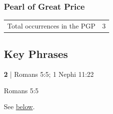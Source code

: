 	\subsubsection{Pearl of Great Price} %
		\label{SHED-PGP}
	
		\begin{tabular}{ll}
			Total occurrences in the PGP & 3
		\end{tabular}
		
		
\subsection{Key Phrases} %
	\label{SHED-PHRASES}

	\begin{compactdesc}
		\item[shed abroad] \textbf{2} | Romans 5:5; 1 Nephi 11:22
			\begin{compactdesc}
				\item[Bible anchor verses] Romans 5:5
					\begin{compactdesc}
						\item[Romans 5:5]  
					\end{compactdesc}
				\item[Commentary] See \hyperref[SHED-abroad]{below}.
			\end{compactdesc}
	\end{compactdesc}
	


	
